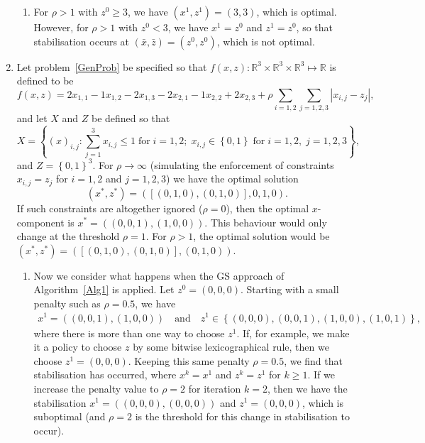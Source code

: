 \documentclass[preprint, 1p, review]{elsarticle}
\newcommand{\braces}[1]{\left\{ #1 \right \}}
\begin{document}
\begin{enumerate}
\begin{enumerate}
\item For $\rho > 1$ with $z^0 \ge 3$, we have $(x^1,z^1)=(3,3)$, which is optimal. However, for $\rho > 1$ with $z^0 < 3$, we have $x^1 = z^0$ and $z^1=z^0$, so that stabilisation occurs at $(\bar{x},\bar{z})=(z^0,z^0)$, which is not optimal. 
\end{enumerate}
\item Let problem~\eqref{GenProb} be specified so that $f(x,z) : \mathbb{R}^3 \times \mathbb{R}^3 \times \mathbb{R}^3 \mapsto \mathbb{R}$ is defined to be
$$
f(x,z) = 2x_{1,1}-1x_{1,2}-2x_{1,3} -2x_{2,1} -1 x_{2,2} + 2x_{2,3} + \rho \sum_{i=1,2} \sum_{j=1,2,3} \left| x_{i,j}-z_j \right|,
$$
and let $X$ and $Z$ be defined so that
$$X = \braces{(x)_{i,j} : \sum_{j=1}^3 x_{i,j} \le 1 \;\text{for}\; i=1,2;\; x_{i,j} \in \braces{0,1}\;\text{for}\; i=1,2,\; j=1,2,3},$$ and $Z = \braces{0,1}^3$.
For $\rho \to \infty$ (simulating the enforcement of constraints $x_{i,j}=z_j$ for $i=1,2$ and $j=1,2,3$) we have the optimal solution 
\[
(x^*,z^*)=\left([(0,1,0),(0,1,0)],0,1,0\right).
\]
If such constraints are altogether ignored ($\rho=0$), then the optimal $x$-component  is $x^*=\left( (0,0,1),(1,0,0) \right)$. 
This behaviour would only change at the threshold $\rho=1$. For $\rho > 1$, the optimal solution would be  
$(x^*,z^*) =   ([(0,1,0),(0,1,0)],(0,1,0))$. 
\begin{enumerate}
\item Now we consider what happens when the GS approach of Algorithm~\ref{Alg1} is applied. Let $z^0=(0,0,0)$. Starting with a small penalty such as $\rho=0.5$, we have
\begin{align*}
x^1=\left( (0,0,1),(1,0,0) \right) \quad \text{and} \quad z^1 \in \braces{(0,0,0), (0,0,1), (1,0,0), (1,0,1)},
\end{align*}
where there is more than one way to choose $z^1$. If, for example, we make it a policy to choose $z$ by some bitwise lexicographical rule, then we choose $z^1=(0,0,0)$.
Keeping this same penalty $\rho=0.5$, we find that stabilisation has occurred, where $x^k=x^1$ and $z^k=z^1$ for $k \ge 1$. 
If we increase the penalty value to $\rho=2$ for iteration $k=2$, then 
we have the stabilisation $x^1=\left( (0,0,0),(0,0,0) \right)$ and $z^1=(0,0,0)$, which is suboptimal (and $\rho=2$ is the threshold for this change in stabilisation to occur).


\end{enumerate}
\end{enumerate}
\end{document}
